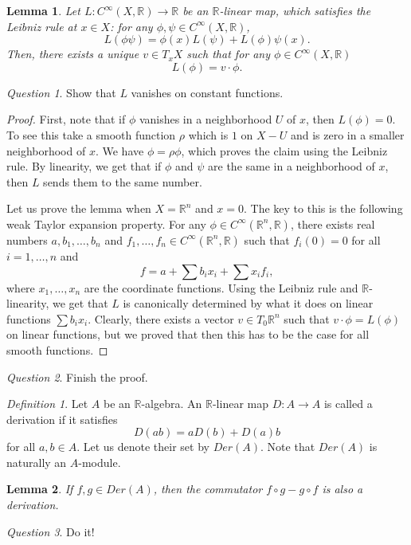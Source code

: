 \documentclass[12pt]{amsart}
\newtheorem{lemma}{Lemma}
\theoremstyle{remark}
\newtheorem{definition}{Definition}
\newtheorem{question}{Question}
\begin{document}
\begin{lemma}
Let $L:C^{\infty}(X,\mathbb{R})\to\mathbb{R}$ be an $\mathbb{R}$-linear map, which satisfies the Leibniz rule at $x\in X$: for any $\phi,\psi\in C^{\infty}(X,\mathbb{R})$, $$L(\phi\psi)=\phi(x)L(\psi)+L(\phi)\psi(x).$$ Then, there exists a unique $v\in T_xX$ such that for any $\phi\in C^{\infty}(X,\mathbb{R})$ $$L(\phi)=v\cdot\phi.$$
\end{lemma}
\begin{question}
Show that $L$ vanishes on constant functions.
\end{question}
\begin{proof}First, note that if $\phi$ vanishes in a neighborhood $U$ of $x$, then $L(\phi)=0$. To see this take a smooth function $\rho$ which is $1$ on $X-U$ and is zero in a smaller neighborhood of $x$. We have $\phi=\rho\phi$, which proves the claim using the Leibniz rule. By linearity, we get that if $\phi$ and $\psi$ are the same in a neighborhood of $x$, then $L$ sends them to the same number. 

Let us prove the lemma when $X=\mathbb{R}^n$ and $x=0$. The key to this is the following weak Taylor expansion property. For any $\phi\in C^{\infty}(\mathbb{R}^n,\mathbb{R})$, there exists real numbers $a,b_1,\ldots ,b_n$ and $f_1,\ldots , f_n\in  C^{\infty}(\mathbb{R}^n,\mathbb{R})$ such that $f_i(0)=0$ for all $i=1,\ldots ,n$ and $$f=a+\sum b_ix_i+\sum x_i f_i,$$ where $x_1,\ldots, x_n$ are the coordinate functions. Using the Leibniz rule and $\mathbb{R}$-linearity, we get that $L$ is canonically determined by what it does on linear functions $\sum b_ix_i$. Clearly, there exists a vector $v\in T_0\mathbb{R}^n$ such that $v\cdot \phi=L(\phi)$ on linear functions, but we proved that then this has to be the case for all smooth functions.
\end{proof}
\begin{question}
Finish the proof.
\end{question}

\begin{definition}
Let $A$ be an $\mathbb{R}$-algebra. An $\mathbb{R}$-linear map $D:A\to A$ is called a derivation if it satisfies $$D(ab)=aD(b)+D(a)b$$ for all $a,b\in A.$ Let us denote their set by $Der(A)$. Note that $Der(A)$ is naturally an $A$-module.
\end{definition}

\begin{lemma}
If $f,g\in Der(A)$, then the commutator $f\circ g- g\circ f$ is also a derivation.
\end{lemma}
\begin{question}
Do it!
\end{question}
\end{document}
